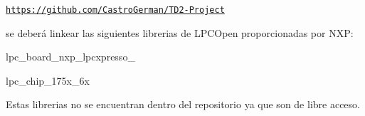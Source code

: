 \href{https://github.com/CastroGerman/TD2-Project}{\tt https\+://github.\+com/\+Castro\+German/\+T\+D2-\/\+Project}

se deberá linkear las siguientes librerias de L\+P\+C\+Open proporcionadas por N\+XP\+:


\begin{DoxyItemize}
\item lpc\+\_\+board\+\_\+nxp\+\_\+lpcxpresso\+\_
\item lpc\+\_\+chip\+\_\+175x\+\_\+6x
\end{DoxyItemize}

Estas librerias no se encuentran dentro del repositorio ya que son de libre acceso. 